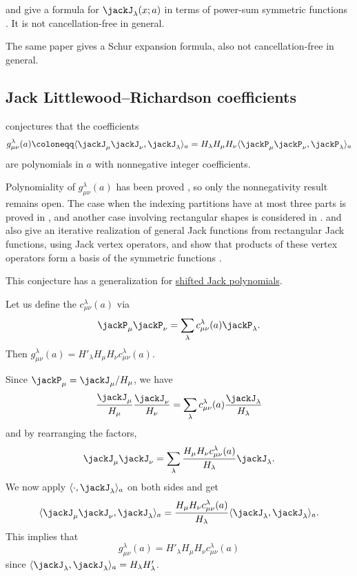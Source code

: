  and  give a formula for
$\jackJ_\lambda (x;a)$ in terms of power-sum symmetric functions
\cite{HaglundWilson2017}.  It is not cancellation-free in general.

The same paper gives a Schur expansion formula, also not cancellation-free in
general.



\subsection[jackLittlewoodRichardsonConjecture]{Jack Littlewood--Richardson coefficients}


\begin{conjecture}
 conjectures that the coefficients
\[
g^\lambda_{\mu\nu}(a)
\coloneqq
\langle \jackJ_\mu \jackJ_\nu, \jackJ_\lambda \rangle_a
=
H_\lambda H_\mu H_\nu
\langle \jackP_\mu \jackP_\nu, \jackP_\lambda \rangle_a
\]
are polynomials in $a$ with nonnegative integer coefficients.
\end{conjecture}
Polynomiality of $g^\lambda_{\mu\nu}(a)$ has been proved
\cite{KnopSahi1997}, so only the nonnegativity result remains open.
The case when the indexing partitions have at most three parts is proved in
\cite{Naqvi2016},
and another case involving rectangular shapes is considered in \cite{CaiJing2013}.
 and  also give an iterative
realization of general Jack functions from rectangular Jack functions, using
Jack vertex operators, and show that products of these vertex operators form a
basis of the symmetric functions \cite{CaiJing2013}.

This conjecture has a generalization for
\hyperref[jackShiftedLittlewoodRichardson]{shifted Jack polynomials}.


\begin{lemma}
Let us define the
\label{jackLittlewoodRichardsonCoefficient}
$c^\lambda_{\mu\nu}(a)$ via
\[
\jackP_\mu \jackP_\nu
=
\sum_{\lambda} c^\lambda_{\mu\nu}(a)  \jackP_\lambda.
\]
Then $g^\lambda_{\mu\nu}(a) = H'_\lambda H_\mu H_\nu c^\lambda_{\mu\nu}(a)$.

\end{lemma}
\begin{proof*}
Since $\jackP_\mu = \jackJ_\mu/H_\mu$, we have
\begin{align}
\frac{\jackJ_\mu}{H_\mu} \frac{\jackJ_\nu}{H_\nu}
=
\sum_{\lambda} c^\lambda_{\mu\nu}(a) \frac{\jackJ_\lambda}{H_\lambda}
\end{align}
and by rearranging the factors,
\[
\jackJ_\mu  \jackJ_\nu
=
\sum_{\lambda}
\frac{H_\mu H_\nu c^\lambda_{\mu\nu}(a)}{H_\lambda}
\jackJ_\lambda.
\]
We now apply $\langle \cdot , \jackJ_\lambda \rangle_a$ on both sides and get
\[
\langle \jackJ_\mu  \jackJ_\nu, \jackJ_\lambda \rangle_a
=
\frac{H_\mu H_\nu c^\lambda_{\mu\nu}(a)}{H_\lambda}
\langle \jackJ_\lambda , \jackJ_\lambda \rangle_a.
\]
This implies that
\[
g^\lambda_{\mu\nu}(a)
=
H'_\lambda H_\mu H_\nu c^\lambda_{\mu\nu}(a)
\]
since
$\langle \jackJ_\lambda , \jackJ_\lambda \rangle_a
= H_\lambda H'_\lambda$.
\end{proof*}

